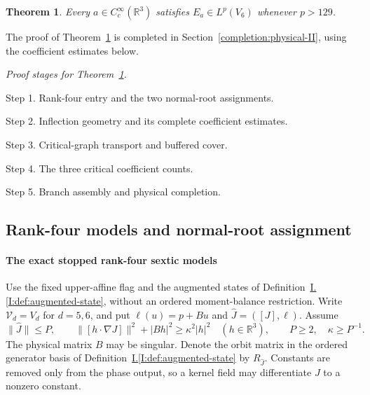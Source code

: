 \documentclass[11pt]{amsart}
\newtheorem{theorem}{Theorem}[section]
\theoremstyle{definition}
\theoremstyle{remark}
\numberwithin{equation}{section}
\newcommand{\partIref}[1]{\hyperref[I:#1]{I.\ref*{I:#1}}}
\begin{document}
\begin{theorem}\label{low:6:s36:main}
Every $a\in C_c^\infty(\mathbb R^3)$ satisfies $E_a\in L^p(V_6)$ whenever $p>129$.
\end{theorem}

The proof of Theorem~\ref{low:6:s36:main} is completed in Section~\ref{completion:physical-II}, using the coefficient estimates below.

\par\smallskip
\noindent\textit{Proof stages for Theorem~\ref{low:6:s36:main}.}\par\nobreak
\noindent\textup{Step 1.} Rank-four entry and the two normal-root assignments.\par\nobreak
\noindent\textup{Step 2.} Inflection geometry and its complete coefficient estimates.\par\nobreak
\noindent\textup{Step 3.} Critical-graph transport and buffered cover.\par\nobreak
\noindent\textup{Step 4.} The three critical coefficient counts.\par\nobreak
\noindent\textup{Step 5.} Branch assembly and physical completion.\par\nobreak
\smallskip

\subsection{Rank-four models and normal-root assignment}\label{low:6:s36m:section}\label{low:6:s36a:section}

\paragraph{The exact stopped rank-four sextic models}

Use the fixed upper-affine flag and the augmented states of Definition~\partIref{def:augmented-state}, without an ordered moment-balance restriction. Write $\mathcal V_d=V_d$ for $d=5,6$, and put $\ell(u)=p+Bu$ and $\widehat J=([J],\ell)$. Assume
\begin{equation}\label{low:6:s36m:stop}
\|\widehat J\|\le P,\qquad \|[h\cdot\nabla J]\|^2+|Bh|^2\ge\kappa^2|h|^2\quad(h\in\mathbb R^3),\qquad P\ge2,\quad\kappa\ge P^{-1}.
\end{equation}
The physical matrix $B$ may be singular. Denote the orbit matrix in the ordered generator basis of Definition~\partIref{def:augmented-state} by $R_{\widehat J}$. Constants are removed only from the phase output, so a kernel field may differentiate $J$ to a nonzero constant.
\end{document}
